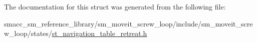 The documentation for this struct was generated from the following file\+:\begin{DoxyCompactItemize}
\item 
smacc\+\_\+sm\+\_\+reference\+\_\+library/sm\+\_\+moveit\+\_\+screw\+\_\+loop/include/sm\+\_\+moveit\+\_\+screw\+\_\+loop/states/\hyperlink{sm__moveit__screw__loop_2include_2sm__moveit__screw__loop_2states_2st__navigation__table__retreat_8h}{st\+\_\+navigation\+\_\+table\+\_\+retreat.\+h}\end{DoxyCompactItemize}
